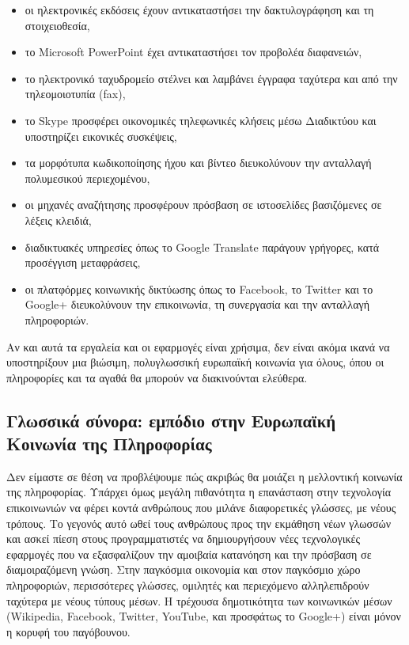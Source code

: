 \documentclass[]{../../metanetpaper}
\begin{document}
\begin{multicols}{2}
\begin{itemize}
\item οι ηλεκτρονικές εκδόσεις έχουν αντικαταστήσει την δακτυλογράφηση και τη στοιχειοθεσία,
\item το Microsoft PowerPoint έχει αντικαταστήσει τον προβολέα διαφανειών,
\item το ηλεκτρονικό ταχυδρομείο στέλνει και λαμβάνει έγγραφα ταχύτερα και από την τηλεομοιοτυπία (fax),
\item το Skype προσφέρει οικονομικές τηλεφωνικές κλήσεις μέσω Διαδικτύου και υποστηρίζει εικονικές συσκέψεις,
\item τα μορφότυπα κωδικοποίησης ήχου και βίντεο διευκολύνουν την ανταλλαγή πολυμεσικού περιεχομένου,
\item οι μηχανές αναζήτησης προσφέρουν πρόσβαση σε ιστοσελίδες βασιζόμενες σε λέξεις κλειδιά,
\item διαδικτυακές υπηρεσίες όπως το Google Translate παράγουν γρήγορες, κατά προσέγγιση μεταφράσεις,
\item οι πλατφόρμες κοινωνικής δικτύωσης όπως το Facebook, το Twitter και το Google+ διευκολύνουν την επικοινωνία, τη συνεργασία και την ανταλλαγή πληροφοριών.
\end{itemize}

Αν και αυτά τα εργαλεία και οι εφαρμογές είναι χρήσιμα, δεν είναι ακόμα ικανά να υποστηρίξουν μια βιώσιμη, πολυγλωσσική ευρωπαϊκή κοινωνία για όλους, όπου οι πληροφορίες και τα αγαθά θα μπορούν να διακινούνται ελεύθερα.

\subsection{Γλωσσικά σύνορα: εμπόδιο στην Ευρωπαϊκή Κοινωνία της Πληροφορίας}
  
Δεν είμαστε σε θέση να προβλέψουμε πώς ακριβώς θα μοιάζει η μελλοντική κοινωνία της πληροφορίας. Υπάρχει όμως μεγάλη πιθανότητα η επανάσταση στην τεχνολογία επικοινωνιών να φέρει κοντά ανθρώπους που μιλάνε διαφορετικές γλώσσες, με νέους τρόπους. Το γεγονός αυτό ωθεί τους ανθρώπους προς την εκμάθηση νέων γλωσσών και ασκεί πίεση στους προγραμματιστές να δημιουργήσουν νέες τεχνολογικές εφαρμογές που να εξασφαλίζουν την αμοιβαία κατανόηση και την πρόσβαση σε διαμοιραζόμενη γνώση. Στην παγκόσμια οικονομία και στον παγκόσμιο χώρο πληροφοριών, περισσότερες γλώσσες, ομιλητές και περιεχόμενο αλληλεπιδρούν ταχύτερα με νέους τύπους μέσων. Η τρέχουσα δημοτικότητα των κοινωνικών μέσων (Wikipedia, Facebook, Twitter, YouTube, και προσφάτως το Google+) είναι μόνον η κορυφή του παγόβουνου.


\end{multicols}
\end{document}
